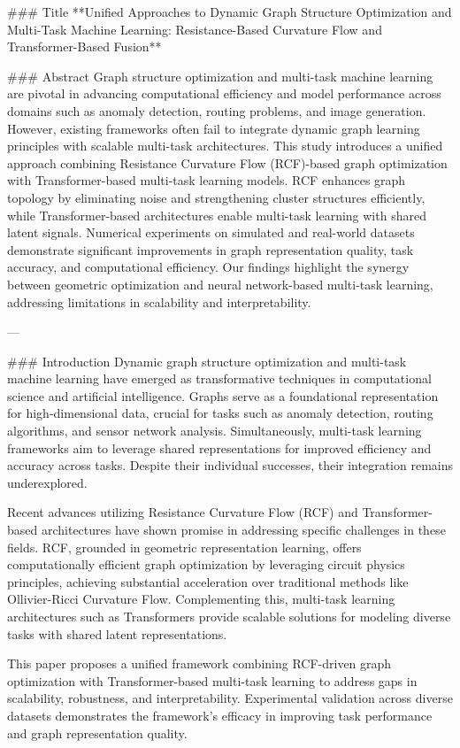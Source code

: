 ### Title
**Unified Approaches to Dynamic Graph Structure Optimization and Multi-Task Machine Learning: Resistance-Based Curvature Flow and Transformer-Based Fusion**

### Abstract
Graph structure optimization and multi-task machine learning are pivotal in advancing computational efficiency and model performance across domains such as anomaly detection, routing problems, and image generation. However, existing frameworks often fail to integrate dynamic graph learning principles with scalable multi-task architectures. This study introduces a unified approach combining Resistance Curvature Flow (RCF)-based graph optimization with Transformer-based multi-task learning models. RCF enhances graph topology by eliminating noise and strengthening cluster structures efficiently, while Transformer-based architectures enable multi-task learning with shared latent signals. Numerical experiments on simulated and real-world datasets demonstrate significant improvements in graph representation quality, task accuracy, and computational efficiency. Our findings highlight the synergy between geometric optimization and neural network-based multi-task learning, addressing limitations in scalability and interpretability.

---

### Introduction
Dynamic graph structure optimization and multi-task machine learning have emerged as transformative techniques in computational science and artificial intelligence. Graphs serve as a foundational representation for high-dimensional data, crucial for tasks such as anomaly detection, routing algorithms, and sensor network analysis. Simultaneously, multi-task learning frameworks aim to leverage shared representations for improved efficiency and accuracy across tasks. Despite their individual successes, their integration remains underexplored.

Recent advances utilizing Resistance Curvature Flow (RCF) and Transformer-based architectures have shown promise in addressing specific challenges in these fields. RCF, grounded in geometric representation learning, offers computationally efficient graph optimization by leveraging circuit physics principles, achieving substantial acceleration over traditional methods like Ollivier-Ricci Curvature Flow. Complementing this, multi-task learning architectures such as Transformers provide scalable solutions for modeling diverse tasks with shared latent representations.

This paper proposes a unified framework combining RCF-driven graph optimization with Transformer-based multi-task learning to address gaps in scalability, robustness, and interpretability. Experimental validation across diverse datasets demonstrates the framework's efficacy in improving task performance and graph representation quality.

